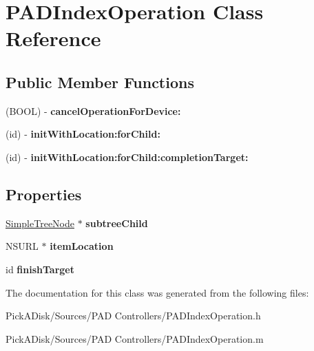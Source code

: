 \hypertarget{interface_p_a_d_index_operation}{
\section{PADIndexOperation Class Reference}
\label{interface_p_a_d_index_operation}
}
\subsection*{Public Member Functions}
\begin{DoxyCompactItemize}
\item 
\hypertarget{interface_p_a_d_index_operation_a367a1cfbc35137246fe2baf8df275cf0}{
(BOOL) -\/ {\bfseries cancelOperationForDevice:}}
\label{interface_p_a_d_index_operation_a367a1cfbc35137246fe2baf8df275cf0}

\item 
\hypertarget{interface_p_a_d_index_operation_a58d600692b5d04cb53eab5b1111de561}{
(id) -\/ {\bfseries initWithLocation:forChild:}}
\label{interface_p_a_d_index_operation_a58d600692b5d04cb53eab5b1111de561}

\item 
\hypertarget{interface_p_a_d_index_operation_ae984e5a5d019c4c5cce1d9963159039d}{
(id) -\/ {\bfseries initWithLocation:forChild:completionTarget:}}
\label{interface_p_a_d_index_operation_ae984e5a5d019c4c5cce1d9963159039d}

\end{DoxyCompactItemize}
\subsection*{Properties}
\begin{DoxyCompactItemize}
\item 
\hypertarget{interface_p_a_d_index_operation_a9e10e7858c64bdec9ddf108957353635}{
\hyperlink{class_simple_tree_node}{SimpleTreeNode} $\ast$ {\bfseries subtreeChild}}
\label{interface_p_a_d_index_operation_a9e10e7858c64bdec9ddf108957353635}

\item 
\hypertarget{interface_p_a_d_index_operation_a3cdb5ce2a2c5f7b43cfd49188c4cf0c2}{
NSURL $\ast$ {\bfseries itemLocation}}
\label{interface_p_a_d_index_operation_a3cdb5ce2a2c5f7b43cfd49188c4cf0c2}

\item 
\hypertarget{interface_p_a_d_index_operation_a4fbdc2a9f80326c85d260eb61aa6e260}{
id {\bfseries finishTarget}}
\label{interface_p_a_d_index_operation_a4fbdc2a9f80326c85d260eb61aa6e260}

\end{DoxyCompactItemize}


The documentation for this class was generated from the following files:\begin{DoxyCompactItemize}
\item 
PickADisk/Sources/PAD Controllers/PADIndexOperation.h\item 
PickADisk/Sources/PAD Controllers/PADIndexOperation.m\end{DoxyCompactItemize}
